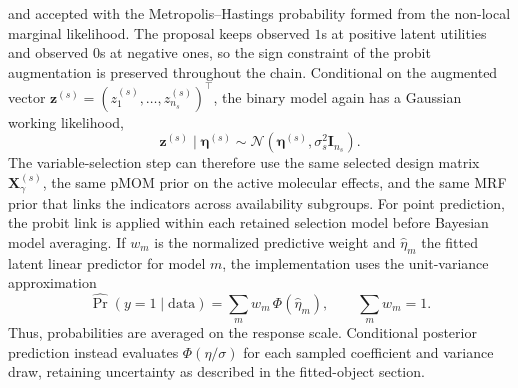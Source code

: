 \documentclass[article]{jss}
\begin{document}
%
and accepted with the Metropolis--Hastings probability formed from the non-local
marginal likelihood.  The proposal keeps observed $1$s at positive latent
utilities and observed $0$s at negative ones, so the sign constraint of the
probit augmentation is preserved throughout the chain.
%
Conditional on the augmented vector
$\bm{z}^{(s)}=(z_1^{(s)},\dots,z_{n_s}^{(s)})^\top$, the binary model again has
a Gaussian working likelihood,
%
\begin{equation}\label{eq:binary-working}
  \bm{z}^{(s)}\mid\bm{\eta}^{(s)}
  \sim \mathcal{N}\!\left(\bm{\eta}^{(s)},\sigma_s^2\bm{I}_{n_s}\right).
\end{equation}
%
The variable-selection step can therefore use the same selected design matrix
$\bm{X}_{\gamma}^{(s)}$, the same pMOM prior on the active molecular effects,
and the same MRF prior that links the indicators across availability subgroups.
For point prediction, the probit link is applied within each retained selection
model before Bayesian model averaging. If $w_m$ is the normalized predictive
weight and $\hat{\eta}_m$ the fitted latent linear predictor for model $m$, the
implementation uses the unit-variance approximation
\[
  \widehat{\Pr}(y=1\mid\text{data})
  = \sum_m w_m\,\Phi(\hat{\eta}_m), \qquad \sum_m w_m=1.
\]
Thus, probabilities are averaged on the response scale. Conditional posterior
prediction instead evaluates $\Phi(\eta/\sigma)$ for each sampled coefficient
and variance draw, retaining uncertainty as described in the fitted-object
section.
\end{document}
